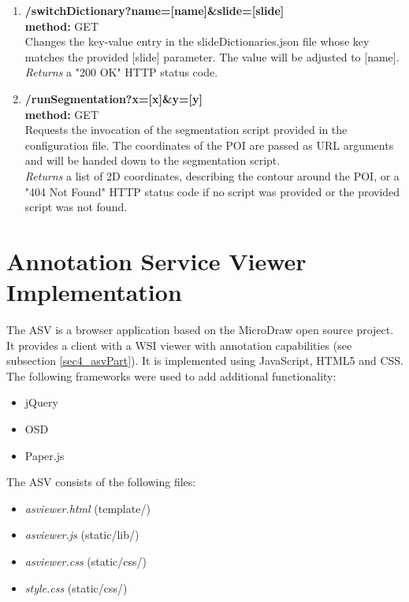 \begin{enumerate}[(1) -]
	\item \textbf{/switchDictionary?name=[name]\&slide=[slide]\\
		method:} GET\\
	Changes the key-value entry in the slideDictionaries.json file whose key matches the provided [slide] parameter. The value will be adjusted to [name].\\
	\emph{Returns} a "200 OK" HTTP status code.
	
	\item \textbf{/runSegmentation?x=[x]\&y=[y]\\
		method:} GET\\
	Requests the invocation of the segmentation script provided in the configuration file. The coordinates of the POI are passed as URL arguments and will be handed down to the segmentation script.\\
	\emph{Returns} a list of 2D coordinates, describing the contour around the POI, or a "404 Not Found" HTTP status code if no script was provided or the provided script was not found.
\end{enumerate}


\section{Annotation Service Viewer Implementation}

The ASV is a browser application based on the MicroDraw open source project. It provides a client with a WSI viewer with annotation capabilities (see subsection \ref{sec4_asvPart}). It is implemented using JavaScript, HTML5 and CSS. The following frameworks were used to add additional functionality:

\begin{itemize}
	\item jQuery
	\item OSD
	\item Paper.js
\end{itemize}

The ASV consists of the following files:

\begin{itemize}
	\item \emph{as{\textunderscore}viewer.html} (template/)
	\item \emph{as{\textunderscore}viewer.js} (static/lib/)
	\item \emph{as{\textunderscore}viewer.css} (static/css/)
	\item \emph{style.css} (static/css/)
\end{itemize}

